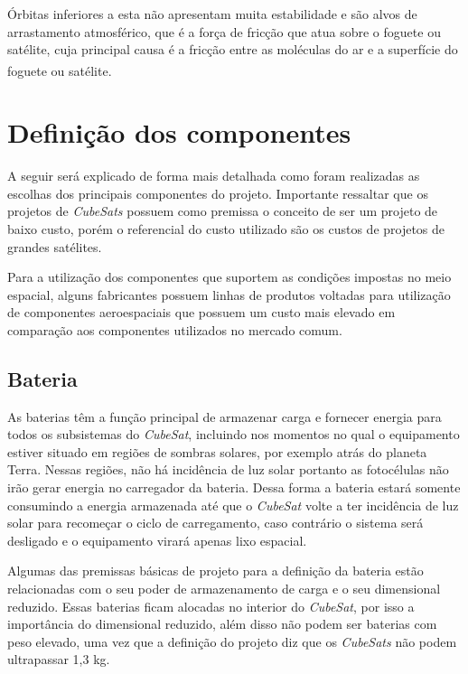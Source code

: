 \documentclass[
	12pt,				%
	openright,			%
	oneside,			%
	a4paper,			%
	english,			%
	french,				%
	spanish,			%
	brazil,				%
	oldfontcommands
	]{abntex2}
\begin{document}
	Órbitas inferiores a esta não apresentam muita estabilidade e são alvos de arrastamento atmosférico, que é a força de fricção que atua sobre o foguete ou satélite, cuja principal causa é a fricção entre as moléculas do ar e a superfície do foguete ou satélite.\textsuperscript{\cite{NASA2}}
	
\section[Definição dos componentes]{Definição dos componentes}

	A seguir será explicado de forma mais detalhada como foram realizadas as escolhas dos principais componentes do projeto. Importante ressaltar que os projetos de \textit{CubeSats} possuem como premissa o conceito de ser um projeto de baixo custo, porém o referencial do custo utilizado são os custos de projetos de grandes satélites.
	
	Para a utilização dos componentes que suportem as condições impostas  no meio espacial, alguns fabricantes possuem linhas de produtos voltadas para utilização de componentes aeroespaciais que possuem um custo mais elevado em comparação aos componentes utilizados no mercado comum.

\subsection[Bateria]{Bateria}

	
	As baterias têm a função principal de armazenar carga e fornecer energia para todos os subsistemas do \textit{CubeSat}, incluindo nos momentos no qual o equipamento estiver situado em regiões de sombras solares, por exemplo atrás do planeta Terra. Nessas regiões, não há incidência de luz solar portanto as fotocélulas não irão gerar energia no carregador da bateria. Dessa forma a bateria estará somente consumindo a energia armazenada até que o \textit{CubeSat} volte a ter incidência de luz solar para recomeçar o ciclo de carregamento, caso contrário o sistema será desligado e o equipamento virará apenas lixo espacial.	
	
	Algumas das premissas básicas de projeto para a definição da bateria estão relacionadas com o seu poder de armazenamento de carga e o seu dimensional reduzido. Essas baterias ficam alocadas no interior do \textit{CubeSat}, por isso a importância do dimensional reduzido, além disso não podem ser baterias com peso elevado, uma vez que a definição do projeto diz que os \textit{CubeSats} não podem ultrapassar 1,3 kg.
	
\end{document}

